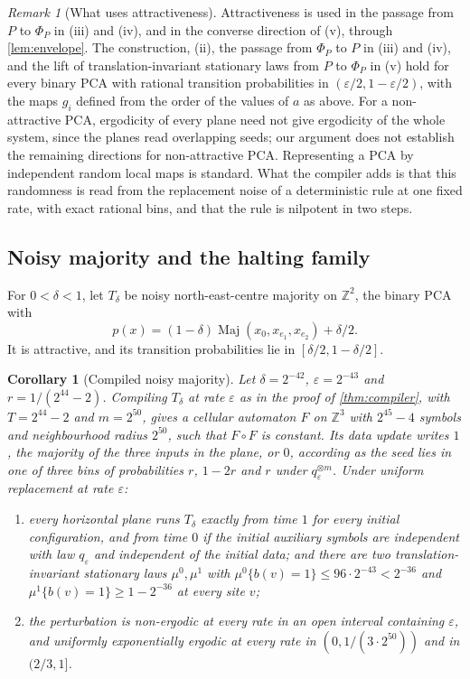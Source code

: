 \documentclass[11pt]{article}
\theoremstyle{plain}
\newtheorem{corollary}[theorem]{Corollary}
\theoremstyle{definition}
\theoremstyle{remark}
\newtheorem{remark}[theorem]{Remark}
\newcommand{\Z}{\mathbb Z}
\newcommand{\eps}{\varepsilon}
\newcommand{\Maj}{\operatorname{Maj}}
\begin{document}
\begin{remark}[What uses attractiveness]\label{rem:compiler-scope}
Attractiveness is used in the passage from $P$ to $\Phi_P$ in (iii) and (iv), and in the converse direction of (v), through \cref{lem:envelope}. The construction, (ii), the passage from $\Phi_P$ to $P$ in (iii) and (iv), and the lift of translation-invariant stationary laws from $P$ to $\Phi_P$ in (v) hold for every binary PCA with rational transition probabilities in $(\eps/2,1-\eps/2)$, with the maps $g_i$ defined from the order of the values of $a$ as above. For a non-attractive PCA, ergodicity of every plane need not give ergodicity of the whole system, since the planes read overlapping seeds; our argument does not establish the remaining directions for non-attractive PCA. Representing a PCA by independent random local maps is standard. What the compiler adds is that this randomness is read from the replacement noise of a deterministic rule at one fixed rate, with exact rational bins, and that the rule is nilpotent in two steps.
\end{remark}

\subsection{Noisy majority and the halting family}

For $0<\delta<1$, let $T_\delta$ be noisy north-east-centre majority on $\Z^2$, the binary PCA with
\[
 p(x)=(1-\delta)\Maj(x_0,x_{e_1},x_{e_2})+\delta/2 .
\]
It is attractive, and its transition probabilities lie in $[\delta/2,1-\delta/2]$.

\begin{corollary}[Compiled noisy majority]\label{cor:compiled-toom}
Let $\delta=2^{-42}$, $\eps=2^{-43}$ and $r=1/(2^{44}-2)$. Compiling $T_\delta$ at rate $\eps$ as in the proof of \cref{thm:compiler}, with $T=2^{44}-2$ and $m=2^{50}$, gives a cellular automaton $F$ on $\Z^3$ with $2^{45}-4$ symbols and neighbourhood radius $2^{50}$, such that $F\circ F$ is constant. Its data update writes $1$, the majority of the three inputs in the plane, or $0$, according as the seed lies in one of three bins of probabilities $r$, $1-2r$ and $r$ under $q_\eps^{\otimes m}$. Under uniform replacement at rate $\eps$:
\begin{enumerate}[label=\textup{(\roman*)}]
\item every horizontal plane runs $T_\delta$ exactly from time $1$ for every initial configuration, and from time $0$ if the initial auxiliary symbols are independent with law $q_\eps$ and independent of the initial data; and there are two translation-invariant stationary laws $\mu^0,\mu^1$ with $\mu^0\{b(v)=1\}\leq96\cdot2^{-43}<2^{-36}$ and $\mu^1\{b(v)=1\}\geq1-2^{-36}$ at every site $v$;
\item the perturbation is non-ergodic at every rate in an open interval containing $\eps$, and uniformly exponentially ergodic at every rate in $(0,1/(3\cdot2^{50}))$ and in $(2/3,1]$.
\end{enumerate}
\end{corollary}
\end{document}
